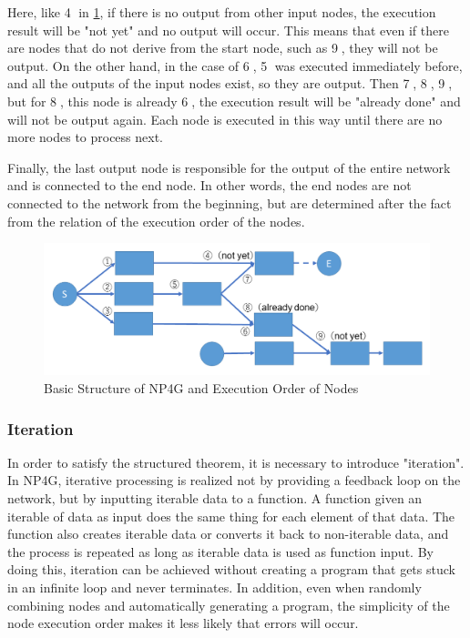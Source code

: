 \documentclass{article}
\begin{document}
Here, like \textcircled{\scriptsize 4} in \ref{fig:sequence}, if there is no output from other input nodes, the execution result will be "not yet" and no output will occur.
This means that even if there are nodes that do not derive from the start node, such as \textcircled{\scriptsize 9}, they will not be output.
On the other hand, in the case of \textcircled{\scriptsize 6}, \textcircled{\scriptsize 5} was executed immediately before, and all the outputs of the input nodes exist, so they are output.
Then \textcircled{\scriptsize 7}, \textcircled{\scriptsize 8}, \textcircled{\scriptsize 9}, but for \textcircled{\scriptsize 8}, this node is already \textcircled{\scriptsize 6}, the execution result will be "already done" and will not be output again.
Each node is executed in this way until there are no more nodes to process next.

Finally, the last output node is responsible for the output of the entire network and is connected to the end node.
In other words, the end nodes are not connected to the network from the beginning, but are determined after the fact from the relation of the execution order of the nodes.

\begin{figure}[t]
\begin{center}
\includegraphics[width=130mm]{sequence.png}
\end{center}
\caption{Basic Structure of NP4G and Execution Order of Nodes}
\label{fig:sequence}
\end{figure}

\subsubsection {Iteration}
In order to satisfy the structured theorem, it is necessary to introduce "iteration".
In NP4G, iterative processing is realized not by providing a feedback loop on the network, but by inputting iterable data to a function.
A function given an iterable of data as input does the same thing for each element of that data.
The function also creates iterable data or converts it back to non-iterable data, and the process is repeated as long as iterable data is used as function input.
By doing this, iteration can be achieved without creating a program that gets stuck in an infinite loop and never terminates.
In addition, even when randomly combining nodes and automatically generating a program, the simplicity of the node execution order makes it less likely that errors will occur.
\end{document}
